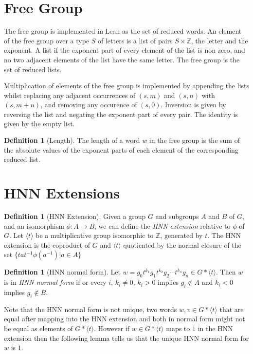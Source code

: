 \documentclass[11pt]{article} %
\theoremstyle{definition}
\theoremstyle{definition}
\theoremstyle{definition}
\theoremstyle{definition}
\theoremstyle{definition}
\newtheorem{defn}[theorem]{Definition}
\theoremstyle{definition}
\begin{document}
\section{Free Group}

The free group is implemented in Lean as the set of reduced words. An element of
the free group over a type $S$ of letters is a list of pairs $S \times \mathbb{Z}$,
the letter and the exponent.
A list if the exponent part of every element of the list is non zero, and
no two adjacent elements of the list have the same letter. The free group is the set of
reduced lists.

Multiplication of elements of the free group is implemented by appending the lists
whilst replacing any adjacent occurrences of $(s, m)$ and $(s, n)$ with $(s, m + n)$, and removing
any occurence of $(s, 0)$. Inversion is given by reversing the list and negating
the exponent part of every pair. The identity is given by the empty list.

\begin{defn}[Length]\label{length}
  The length of a word $w$ in the free group is the sum of the absolute values of the exponent
  parts of each element of the corresponding reduced list.
\end{defn}

\section{HNN Extensions}\label{HNN}

\begin{defn}[HNN Extension]
  Given a group $G$ and subgroups $A$ and $B$ of $G$, and an isomorphism $\phi : A \to B$, we can define
  the \textit{HNN extension} relative to $\phi$ of $G$. Let $\langle t \rangle$ be a multiplicative group isomorphic to
  $\mathbb{Z}$, generated by $t$. The HNN extension is the coproduct
  of $G$ and $\langle t \rangle$ quotiented
  by the normal closure of the set $\{ta t^{-1} \phi(a^{-1}) | a \in A\}$
\end{defn}

\begin{defn}[HNN normal form]\label{HNNnormalform}
  Let $w = g_0t^{k_1}g_1t^{k_2}g_2 \cdots t^{k_n}g_n \in G \ast \langle t \rangle$.
  Then $w$ is in \textit{HNN normal form} if or every $i$, $k_i \ne 0$, $k_i > 0$
  implies $g_i \notin A$ and $k_i < 0$ implies $g_i \notin B$.
\end{defn}

Note that the HNN normal form is not unique, two words $w, v \in G \ast \langle t \rangle$
that are equal after mapping into the HNN extension and both in normal form might not be
equal as elements of $G \ast \langle t \rangle$. However if $w \in G \ast \langle t \rangle $
maps to $1$ in the HNN extension
then the following lemma tells us that the unique HNN normal form for $w$ is $1$.
\end{document}
